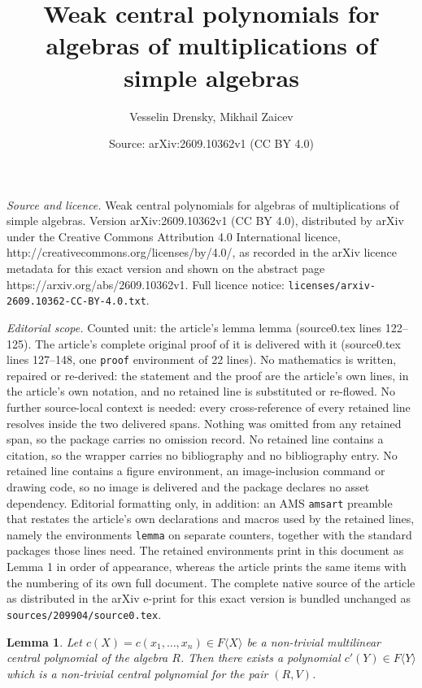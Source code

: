 \documentclass[10pt,a4paper]{amsart}
\title{Weak central polynomials for algebras of multiplications of simple algebras}
\author{Vesselin Drensky, Mikhail Zaicev}
\date{Source: arXiv:2609.10362v1 (CC BY 4.0)}
\newtheorem{lemma}{Lemma}
\begin{document}
\maketitle

\noindent\emph{Source and licence.} Weak central polynomials for algebras of multiplications of simple algebras. Version arXiv:2609.10362v1 (CC BY 4.0), distributed by arXiv under the Creative Commons Attribution 4.0 International licence, http://creativecommons.org/licenses/by/4.0/, as recorded in the arXiv licence metadata for this exact version and shown on the abstract page https://arxiv.org/abs/2609.10362v1. Full licence notice: \texttt{licenses/arxiv-2609.10362-CC-BY-4.0.txt}.\par\smallskip

\noindent\textit{Editorial scope.} Counted unit: the article's lemma lemma (source0.tex lines 122--125). The article's complete original proof of it is delivered with it (source0.tex lines 127--148, one \texttt{proof} environment of 22 lines). No mathematics is written, repaired or re-derived: the statement and the proof are the article's own lines, in the article's own notation, and no retained line is substituted or re-flowed.  No further source-local context is needed: every cross-reference of every retained line resolves inside the two delivered spans.  Nothing was omitted from any retained span, so the package carries no omission record.  No retained line contains a citation, so the wrapper carries no bibliography and no bibliography entry.  No retained line contains a figure environment, an image-inclusion command or drawing code, so no image is delivered and the package declares no asset dependency.  Editorial formatting only, in addition: an AMS \texttt{amsart} preamble that restates the article's own declarations and macros used by the retained lines, namely the environments \texttt{lemma} on separate counters, together with the standard packages those lines need.  The retained environments print in this document as Lemma 1 in order of appearance, whereas the article prints the same items with the numbering of its own full document.  The complete native source of the article as distributed in the arXiv e-print for this exact version is bundled unchanged as \texttt{sources/209904/source0.tex}.
\begin{lemma}\label{the main lemma}
Let $c(X)=c(x_1,\ldots,x_n)\in F\langle X\rangle$ be a non-trivial multilinear central polynomial of the algebra $R$.
Then there exists a polynomial $c'(Y)\in F\langle Y\rangle$ which is a non-trivial central polynomial for the pair $(R,V)$.
\end{lemma}
\end{document}
